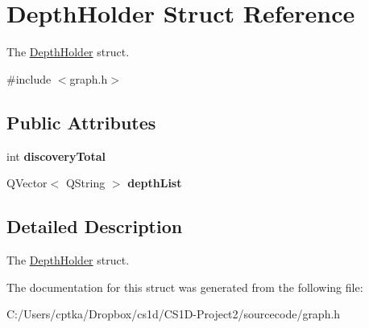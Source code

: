 \hypertarget{struct_depth_holder}{}\section{Depth\+Holder Struct Reference}
\label{struct_depth_holder}


The \mbox{\hyperlink{struct_depth_holder}{Depth\+Holder}} struct.  




{\ttfamily \#include $<$graph.\+h$>$}

\subsection*{Public Attributes}
\begin{DoxyCompactItemize}
\item 
\mbox{\label{struct_depth_holder_ae1bc7b8b045c5ae3e8093f6f4e6d7428}} 
int {\bfseries discovery\+Total}
\item 
\mbox{\label{struct_depth_holder_a5930ad6e00cec15dad298cb3c36afef5}} 
Q\+Vector$<$ Q\+String $>$ {\bfseries depth\+List}
\end{DoxyCompactItemize}


\subsection{Detailed Description}
The \mbox{\hyperlink{struct_depth_holder}{Depth\+Holder}} struct. 

The documentation for this struct was generated from the following file\+:\begin{DoxyCompactItemize}
\item 
C\+:/\+Users/cptka/\+Dropbox/cs1d/\+C\+S1\+D-\/\+Project2/sourcecode/graph.\+h\end{DoxyCompactItemize}
